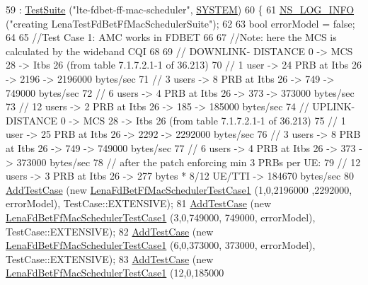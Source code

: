 \begin{DoxyCode}
59   : \hyperlink{classns3_1_1TestSuite_a904b0c40583b744d30908aeb94636d1a}{TestSuite} (\textcolor{stringliteral}{"lte-fdbet-ff-mac-scheduler"}, \hyperlink{classns3_1_1TestSuite_a1ebfcab34ec8161e085e8e3a1855eae0a90c5529a26ab3a5ffcc6e57040dbd82e}{SYSTEM})
60 \{
61   \hyperlink{group__logging_gafbd73ee2cf9f26b319f49086d8e860fb}{NS\_LOG\_INFO} (\textcolor{stringliteral}{"creating LenaTestFdBetFfMacSchedulerSuite"});
62 
63   \textcolor{keywordtype}{bool} errorModel = \textcolor{keyword}{false};
64 
65   \textcolor{comment}{//Test Case 1: AMC works in FDBET}
66 
67   \textcolor{comment}{//Note: here the MCS is calculated by the wideband CQI}
68 
69   \textcolor{comment}{// DOWNLINK- DISTANCE 0 -> MCS 28 -> Itbs 26 (from table 7.1.7.2.1-1 of 36.213)}
70   \textcolor{comment}{// 1 user -> 24 PRB at Itbs 26 -> 2196 -> 2196000 bytes/sec}
71   \textcolor{comment}{// 3 users -> 8 PRB at Itbs 26 -> 749 -> 749000 bytes/sec}
72   \textcolor{comment}{// 6 users -> 4 PRB at Itbs 26 -> 373 -> 373000 bytes/sec}
73   \textcolor{comment}{// 12 users -> 2 PRB at Itbs 26 -> 185 -> 185000 bytes/sec }
74   \textcolor{comment}{// UPLINK- DISTANCE 0 -> MCS 28 -> Itbs 26 (from table 7.1.7.2.1-1 of 36.213)}
75   \textcolor{comment}{// 1 user -> 25 PRB at Itbs 26 -> 2292 -> 2292000 bytes/sec}
76   \textcolor{comment}{// 3 users -> 8 PRB at Itbs 26 -> 749 -> 749000 bytes/sec}
77   \textcolor{comment}{// 6 users -> 4 PRB at Itbs 26 -> 373 -> 373000 bytes/sec}
78   \textcolor{comment}{// after the patch enforcing min 3 PRBs per UE:}
79   \textcolor{comment}{// 12 users -> 3 PRB at Itbs 26 -> 277 bytes * 8/12 UE/TTI -> 184670 bytes/sec}
80   \hyperlink{classns3_1_1TestCase_a3718088e3eefd5d6454569d2e0ddd835}{AddTestCase} (\textcolor{keyword}{new} \hyperlink{classLenaFdBetFfMacSchedulerTestCase1}{LenaFdBetFfMacSchedulerTestCase1} (1,0,2196000
      ,2292000, errorModel), TestCase::EXTENSIVE);
81   \hyperlink{classns3_1_1TestCase_a3718088e3eefd5d6454569d2e0ddd835}{AddTestCase} (\textcolor{keyword}{new} \hyperlink{classLenaFdBetFfMacSchedulerTestCase1}{LenaFdBetFfMacSchedulerTestCase1} (3,0,749000,
      749000, errorModel), TestCase::EXTENSIVE);
82   \hyperlink{classns3_1_1TestCase_a3718088e3eefd5d6454569d2e0ddd835}{AddTestCase} (\textcolor{keyword}{new} \hyperlink{classLenaFdBetFfMacSchedulerTestCase1}{LenaFdBetFfMacSchedulerTestCase1} (6,0,373000,
      373000, errorModel), TestCase::EXTENSIVE);
83   \hyperlink{classns3_1_1TestCase_a3718088e3eefd5d6454569d2e0ddd835}{AddTestCase} (\textcolor{keyword}{new} \hyperlink{classLenaFdBetFfMacSchedulerTestCase1}{LenaFdBetFfMacSchedulerTestCase1} (12,0,185000

\end{DoxyCode}
